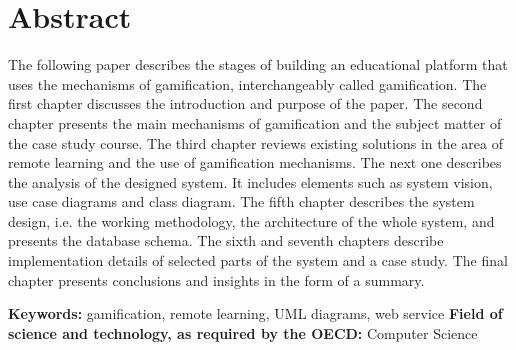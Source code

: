 \chapter*{Abstract}
\indent The following paper describes the stages of building an educational platform that uses the mechanisms of gamification, interchangeably called gamification. The first chapter discusses the introduction and purpose of the paper. The second chapter presents the main mechanisms of gamification and the subject matter of the case study course. The third chapter reviews existing solutions in the area of remote learning and the use of gamification mechanisms. The next one describes the analysis of the designed system. It includes elements such as system vision, use case diagrams and class diagram. The fifth chapter describes the system design, i.e. the working methodology, the architecture of the whole system, and presents the database schema. The sixth and seventh chapters describe implementation details of selected parts of the system and a case study. The final chapter presents conclusions and insights in the form of a summary. \vspace{0.5cm}\newline

\noindent \textbf{Keywords:} gamification, remote learning, UML diagrams, web service\vspace{0.5cm}\newline
\noindent \textbf{Field of science and technology, as required by the OECD: } Computer Science